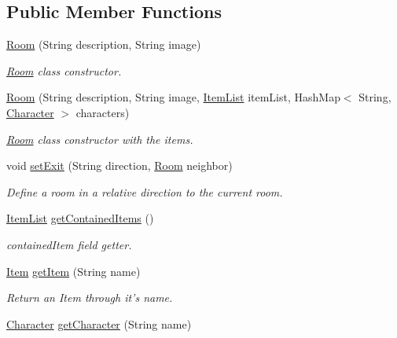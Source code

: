 \subsection*{Public Member Functions}
\begin{DoxyCompactItemize}
\item 
\hyperlink{classpkg__world_1_1Room_ae48ca6830c8c9368ab1cb7e9b006d157}{Room} (String description, String image)
\begin{DoxyCompactList}\small\item\em \hyperlink{classpkg__world_1_1Room}{Room} class constructor. \end{DoxyCompactList}\item 
\hyperlink{classpkg__world_1_1Room_abd6108f1f6d320be8d4fc1418f09d2eb}{Room} (String description, String image, \hyperlink{classpkg__world_1_1pkg__items_1_1ItemList}{Item\-List} item\-List, Hash\-Map$<$ String, \hyperlink{classpkg__world_1_1pkg__characters_1_1Character}{Character} $>$ characters)
\begin{DoxyCompactList}\small\item\em \hyperlink{classpkg__world_1_1Room}{Room} class constructor with the items. \end{DoxyCompactList}\item 
void \hyperlink{classpkg__world_1_1Room_a4a97591f3b574b3d0086843a919a0214}{set\-Exit} (String direction, \hyperlink{classpkg__world_1_1Room}{Room} neighbor)
\begin{DoxyCompactList}\small\item\em Define a room in a relative direction to the current room. \end{DoxyCompactList}\item 
\hyperlink{classpkg__world_1_1pkg__items_1_1ItemList}{Item\-List} \hyperlink{classpkg__world_1_1Room_a969205a4d2d2d9e30d1e1db9fc3f0b43}{get\-Contained\-Items} ()
\begin{DoxyCompactList}\small\item\em contained\-Item field getter. \end{DoxyCompactList}\item 
\hyperlink{classpkg__world_1_1pkg__items_1_1Item}{Item} \hyperlink{classpkg__world_1_1Room_a8624c98bd006830d4484dae2dcd8c8e7}{get\-Item} (String name)
\begin{DoxyCompactList}\small\item\em Return an Item through it's name. \end{DoxyCompactList}\item 
\hyperlink{classpkg__world_1_1pkg__characters_1_1Character}{Character} \hyperlink{classpkg__world_1_1Room_afe89d01c098acd297e91d313cb65aff1}{get\-Character} (String name)

\end{DoxyCompactItemize}
